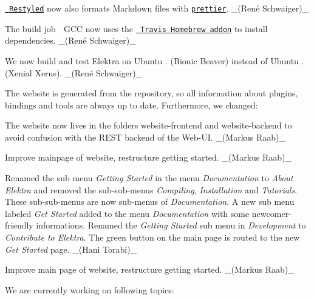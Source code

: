 \begin{DoxyItemize}
\item \href{https://restyled.io}{\texttt{ Restyled}} now also formats Markdown files with \href{https://prettier.io}{\texttt{ {\ttfamily prettier}}}. \+\_\+(René Schwaiger)\+\_\+
\end{DoxyItemize}


\begin{DoxyItemize}
\item The build job {\ttfamily 🍏 G\+CC} now uses the \href{https://docs.travis-ci.com/user/installing-dependencies/\#installing-packages-on-macos}{\texttt{ Travis Homebrew addon}} to install dependencies. \+\_\+(René Schwaiger)\+\_\+
\item We now build and test Elektra on Ubuntu {.} (Bionic Beaver) instead of Ubuntu {.} (Xenial Xerus). \+\_\+(René Schwaiger)\+\_\+
\end{DoxyItemize}

The website is generated from the repository, so all information about plugins, bindings and tools are always up to date. Furthermore, we changed\+:


\begin{DoxyItemize}
\item The website now lives in the folders website-\/frontend and website-\/backend to avoid confusion with the R\+E\+ST backend of the Web-\/\+UI. \+\_\+(\+Markus Raab)\+\_\+
\item Improve mainpage of website, restructure getting started. \+\_\+(\+Markus Raab)\+\_\+
\item Renamed the sub menu {\itshape Getting Started} in the menu {\itshape Documentation} to {\itshape About Elektra} and removed the sub-\/sub-\/menus {\itshape Compiling}, {\itshape Installation} and {\itshape Tutorials}. These sub-\/sub-\/menus are now sub-\/menus of {\itshape Documentation}. A new sub menu labeled {\itshape Get Started} added to the menu {\itshape Documentation} with some newcomer-\/friendly informations. Renamed the {\itshape Getting Started} sub menu in {\itshape Development} to {\itshape Contribute to Elektra}. The green button on the main page is routed to the new {\itshape Get Started} page. \+\_\+(\+Hani Torabi)\+\_\+
\item Improve main page of website, restructure getting started. \+\_\+(\+Markus Raab)\+\_\+
\end{DoxyItemize}

We are currently working on following topics\+:


